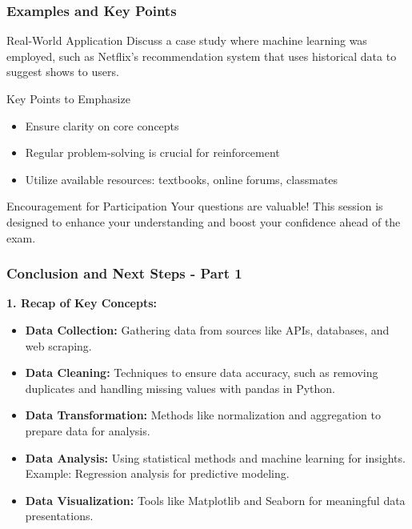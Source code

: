\documentclass[aspectratio=169]{beamer}
\begin{document}
\begin{frame}[fragile]
    \frametitle{Examples and Key Points}
    \begin{block}{Real-World Application}
        Discuss a case study where machine learning was employed, such as Netflix's recommendation system that uses historical data to suggest shows to users.
    \end{block}

    \begin{block}{Key Points to Emphasize}
        \begin{itemize}
            \item Ensure clarity on core concepts
            \item Regular problem-solving is crucial for reinforcement
            \item Utilize available resources: textbooks, online forums, classmates
        \end{itemize}
    \end{block}
    
    \begin{block}{Encouragement for Participation}
        Your questions are valuable! This session is designed to enhance your understanding and boost your confidence ahead of the exam.
    \end{block}
\end{frame}

\begin{frame}[fragile]
    \frametitle{Conclusion and Next Steps - Part 1}
    
    \textbf{1. Recap of Key Concepts:}
    \begin{itemize}
        \item \textbf{Data Collection:} Gathering data from sources like APIs, databases, and web scraping.
        \item \textbf{Data Cleaning:} Techniques to ensure data accuracy, such as removing duplicates and handling missing values with pandas in Python.
        \item \textbf{Data Transformation:} Methods like normalization and aggregation to prepare data for analysis.
        \item \textbf{Data Analysis:} Using statistical methods and machine learning for insights. Example: Regression analysis for predictive modeling.
        \item \textbf{Data Visualization:} Tools like Matplotlib and Seaborn for meaningful data presentations.
    \end{itemize}
\end{frame}
\end{document}
